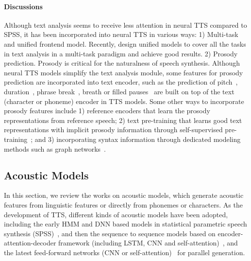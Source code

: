\documentclass{article}
\begin{document}
\paragraph{Discussions} Although text analysis seems to receive less attention in neural TTS compared to SPSS, it has been incorporated into neural TTS in various ways: 1) Multi-task and unified frontend model. Recently, \citet{pan2020unified,zhang2020unified} design unified models to cover all the tasks in text analysis in a multi-task paradigm and achieve good results. 2) Prosody prediction. Prosody is critical for the naturalness of speech synthesis. Although neural TTS models simplify the text analysis module, some features for prosody prediction are incorporated into text encoder, such as the prediction of pitch~\cite{ren2021fastspeech}, duration~\cite{ren2019fastspeech}, phrase break~\cite{liu2020modeling}, breath or filled pauses~\cite{yan2021adaspeech3} are built on top of the text (character or phoneme) encoder in TTS models. Some other ways to incorporate prosody features include 1) reference encoders that learn the prosody representations from reference speech; 2) text pre-training that learns good text representations with implicit prosody information through self-supervised pre-training~\cite{hayashi2019pre,guo2019exploiting}; and 3) incorporating syntax information through dedicated modeling methods such as graph networks~\cite{liu2020graphspeech}. 



\subsection{Acoustic Models} 
\label{sec_funda_am}
In this section, we review the works on acoustic models, which generate acoustic features from linguistic features or directly from phonemes or characters. As the development of TTS, different kinds of acoustic models have been adopted, including the early HMM and DNN based models in statistical parametric speech synthesis (SPSS)~\cite{yoshimura1999simultaneous,tokuda2000speech,zen2013statistical,qian2014training,fan2014tts,zen2015unidirectional}, and then the sequence to sequence models based on encoder-attention-decoder framework (including LSTM, CNN and self-attention)~\cite{wang2017tacotron,shen2018natural,ping2018deep,li2019neural}, and the latest feed-forward networks (CNN or self-attention)~\cite{ren2019fastspeech,peng2020non} for parallel generation.
\end{document}
